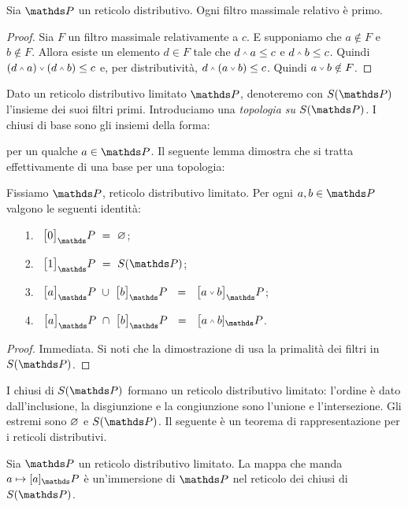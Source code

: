 \begin{lemma}\label{massimalisonoprimi}
Sia $\PP$ un reticolo distributivo. Ogni filtro massimale relativo \`e primo.
\end{lemma}

\begin{proof}
Sia $F$ un filtro massimale relativamente a $c$. E supponiamo che $a\notin F$ e $b\notin F$. Allora esiste un elemento $d\in F$ tale che $d\swedge a\le c$ e $d\swedge b\le c$. Quindi $(d\swedge a)\svee(d\swedge b)\le c$ e, per distributivit\`a, $d\swedge (a\svee b)\le c$. Quindi $a\svee b\notin F$.
\end{proof}

Dato un reticolo distributivo limitato $\PP$, denoteremo con \emph{$S(\PP)$\/} l'insieme dei suoi filtri primi. Introduciamo una \emph{topologia su $S(\PP)$}. I chiusi di base sono gli insiemi della forma:

\noindent{}

per un qualche $a\in\PP$. Il seguente lemma dimostra che si tratta effettivamente di una base per una topologia:

\begin{lemma}\label{brouwerstopology}
Fissiamo $\PP$, reticolo distributivo limitato. Per ogni $a,b\in\PP$ valgono le seguenti identit\`a:
\begin{itemize}
\item[1.]\ $\big[0\big]_\PP\ =\ \0$;
\item[2.]\ $\big[1\big]_\PP\ =\ S(\PP)$;
\item[3.]\ $\big[a\big]_\PP\ \cup\ \big[b\big]_\PP\ \ =\ \ \big[a\svee b\big]_\PP$;
\item[4.]\ $\big[a\big]_\PP\ \cap\ \big[b\big]_\PP\ \ =\ \ \big[a\swedge b]_\PP$.
\end{itemize}
\end{lemma}
\begin{proof}
Immediata. Si noti che la dimostrazione di  usa la primalit\`a dei filtri in $S(\PP)$.
\end{proof}

I chiusi di $S(\PP)$ formano un reticolo distributivo limitato: l'ordine \`e dato dall'inclusione, la disgiunzione e la congiunzione sono l'unione e l'intersezione. Gli estremi sono $\varnothing$ e $S(\PP)$. Il seguente \`e un teorema di rappresentazione per i reticoli distributivi.

\begin{theorem}
Sia $\PP$ un reticolo distributivo limitato. La mappa che manda $a\mapsto [a]_\PP$ \`e un'immersione di $\PP$ nel reticolo dei chiusi di $S(\PP)$. 
\end{theorem}

